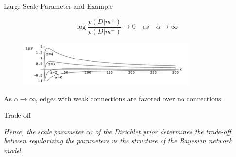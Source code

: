 \documentclass{beamer}
\begin{document}
\begin{frame}{Large Scale-Parameter and Example}

    $$\log\frac{p(D | m^+)}{p(D | m^-)} \to 0 \quad as \quad \alpha \to \infty $$

    \begin{figure}
        \centering
        \includegraphics[width=0.8\textwidth]{figures/lBF-alpha.png}
    \end{figure}

    As $\alpha \to \infty$, edges with weak connections are favored over no connections. 

\end{frame}
\begin{frame}{Trade-off}

\textit{Hence, the scale parameter $\alpha$: of the Dirichlet prior
determines the trade-off between regularizing the parameters vs the structure of the Bayesian network model.}

\end{frame}
\end{document}
